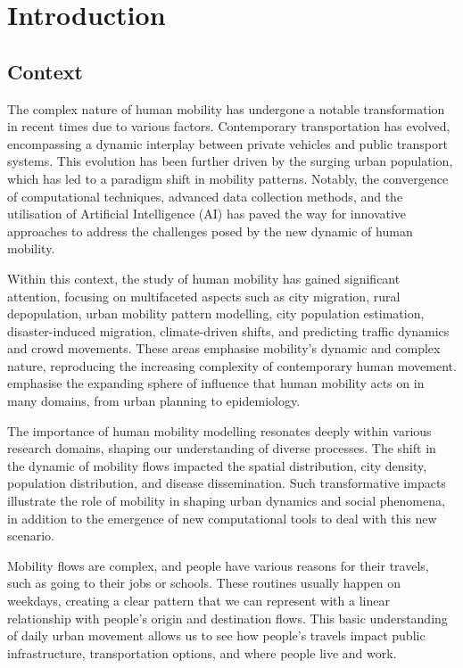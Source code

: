 \chapter{Introduction}
\label{chapterlabel1}

    \section{Context} 

    The complex nature of human mobility has undergone a notable transformation in recent times due to various factors. Contemporary transportation has evolved, encompassing a dynamic interplay between private vehicles and public transport systems. This evolution has been further driven by the surging urban population, which has led to a paradigm shift in mobility patterns. Notably, the convergence of computational techniques, advanced data collection methods, and the utilisation of Artificial Intelligence (AI) has paved the way for innovative approaches to address the challenges posed by the new dynamic of human mobility. 
    
    Within this context, the study of human mobility has gained significant attention, focusing on multifaceted aspects such as city migration, rural depopulation, urban mobility pattern modelling, city population estimation, disaster-induced migration, climate-driven shifts, and predicting traffic dynamics and crowd movements. These areas emphasise mobility's dynamic and complex nature, reproducing the increasing complexity of contemporary human movement. \cite{siminiDeepGravityModel2021} emphasise the expanding sphere of influence that human mobility acts on in many domains, from urban planning to epidemiology.
        
    The importance of human mobility modelling resonates deeply within various research domains, shaping our understanding of diverse processes. The shift in the dynamic of mobility flows impacted the spatial distribution, city density, population distribution, and disease dissemination. Such transformative impacts illustrate the role of mobility in shaping urban dynamics and social phenomena, in addition to the emergence of new computational tools to deal with this new scenario. 
    
    Mobility flows are complex, and people have various reasons for their travels, such as going to their jobs or schools. These routines usually happen on weekdays, creating a clear pattern that we can represent with a linear relationship with people's origin and destination flows. This basic understanding of daily urban movement allows us to see how people's travels impact public infrastructure, transportation options, and where people live and work.
    
